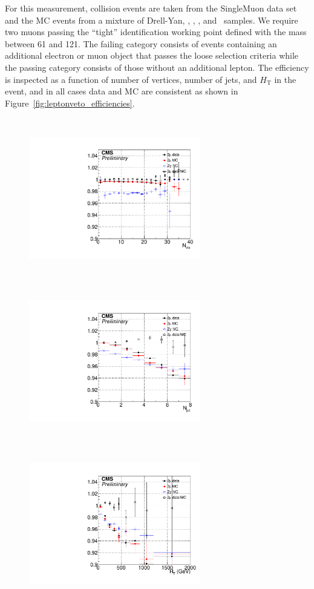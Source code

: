 For this measurement, collision events are taken from the SingleMuon data set and the MC events from a mixture of Drell-Yan, \ttbar, \PW\PW, \PW\PZ, and \PZ\PZ\ samples. 
We require two muons passing the ``tight'' identification working point defined  with the mass between 61 and 121\GeV. 
The failing category consists of events containing an additional electron or muon object that passes the loose selection criteria while the passing category consists of those without an additional lepton. 
The efficiency is inspected as a function of number of vertices, number of jets, and $H_{\mathrm{T}}$ in the event, and in all cases data and MC are consistent as shown in Figure~\ref{fig:leptonveto_efficiencies}.

\begin{figure}[tbph]
 \centering
  \includegraphics[width=7.5cm,height=7cm]{Analysis/Figures/leptonveto/leptonveto_eff_npv.pdf}
  \includegraphics[width=7.5cm,height=7cm]{Analysis/Figures/leptonveto/leptonveto_eff_njet.pdf}
  \includegraphics[width=7.5cm,height=7cm]{Analysis/Figures/leptonveto/leptonveto_eff_ht.pdf}

\end{figure}

